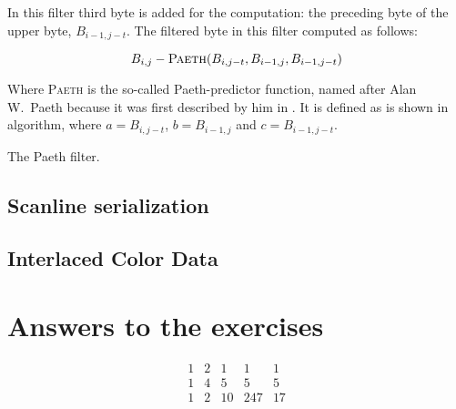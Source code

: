 In this filter third byte is added for the computation: the preceding
byte of the upper byte, $B_{i-1,j-t}$. The filtered byte in this
filter computed as follows:

\begin{equation*}
  B_{i,j} - \textsc{Paeth}(B_{i,j-t},B_{i-1,j},B_{i-1,j-t})
\end{equation*}

Where \textsc{Paeth} is the so-called Paeth-predictor function, named
after Alan W.~Paeth because it was first described by him in
\cite{arvo1994graphics_gems}. It is defined as is shown in algorithm,
where $a=B_{i,j-t}$, $b=B_{i-1,j}$ and $c=B_{i-1,j-t}$.


\begin{algorithm}[H]
  \caption{The Paeth filter.}
  \label{alg:paeth}
  \begin{algorithmic}[1]
    \State {}
    \State {}
    \Else
    \State {}
    \EndIf
    \EndProcedure
  \end{algorithmic}
\end{algorithm}


\subsection{Scanline serialization}

\subsection{Interlaced Color Data}
\label{png-interlacing}

\section{Answers to the exercises}

\begin{Answer}[ref={filter-1}]

\[
 \begin{matrix}
  1 & 2 & 1 & 1 & 1 \\
  1 & 4 & 5 & 5 & 5 \\
  1 & 2 & 10 & 247 & 17
 \end{matrix}
\]


\end{Answer}


